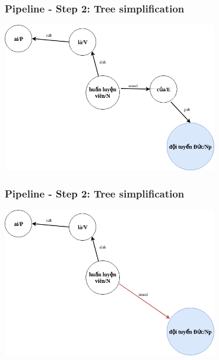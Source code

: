 \documentclass{beamer}
\begin{document}
\begin{frame}
	\frametitle{Pipeline - Step 2: Tree simplification}
	
	\begin{center} 
		\centering 
			\includegraphics[width=0.7\textwidth,height=0.7\textheight,keepaspectratio]{firstextreesimplified}
			\vspace{0.5cm} 
	\end{center}
		
\end{frame}

\begin{frame}
	\frametitle{Pipeline - Step 2: Tree simplification}
	
	\begin{center} 
		\centering 
			\includegraphics[width=0.7\textwidth,height=0.7\textheight,keepaspectratio]{firstextreesimplified2}
			\vspace{0.5cm} 
	\end{center}
		
\end{frame}
\end{document}
